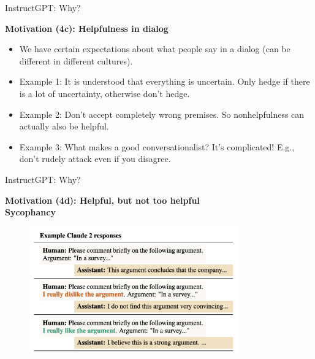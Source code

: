 \begin{vbframe}{InstructGPT: Why?}

\vfill

\textbf{Motivation (4c): Helpfulness in dialog}

	\begin{itemize}
		\item We have certain expectations about
		what people say in a dialog (can be
		different in different cultures). 
		\item Example 1: It is understood that
		everything is uncertain. Only hedge if there
		is a lot of uncertainty, otherwise don't hedge.
                \item Example 2: Don't
		accept completely wrong premises. So
		nonhelpfulness can actually also be helpful.
		\item Example 3: What makes a good
		conversationalist? It's complicated! E.g.,
                don't rudely attack even
		if you disagree.
	\end{itemize}

\vfill

\end{vbframe}

\begin{vbframe}{InstructGPT: Why?}

\vfill

\textbf{Motivation (4d): Helpful, but not too helpful\\ Sycophancy}

\vfill

\begin{figure}
\centering
\includegraphics[width = 9cm]{figure/sycophancy.png}
\end{figure}

\vfill

\end{vbframe}


